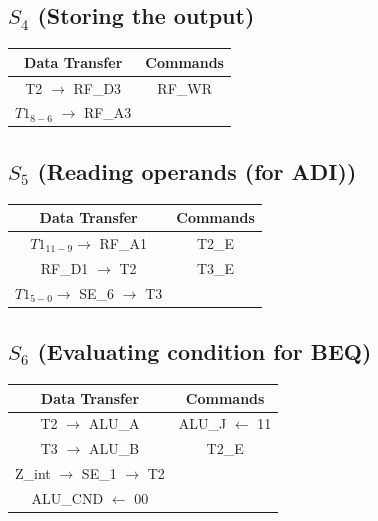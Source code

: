 \documentclass[]{report}
\begin{document}
        \subsection*{$S_4$ (Storing the output)}
        \begin{center}
            \begin{tabular}{|c|c|}
                \hline
                Data Transfer & Commands \\
                \hline
                T2 $\to$ RF\_D3 & RF\_WR\\
                $T1_{8-6}$ $\to$ RF\_A3 & \\                
                \hline
            \end{tabular}
        \end{center}
        \subsection*{$S_5$ (Reading operands (for ADI))}
        \begin{center}
            \begin{tabular}{|c|c|}
                \hline
                Data Transfer & Commands \\
                \hline
                $T1_{11-9} \to$ RF\_A1  & T2\_E\\
                RF\_D1 $\to$ T2 & T3\_E\\
                $T1_{5-0} \to$ SE\_6 $\to$ T3 & \\
                \hline
            \end{tabular}
        \end{center}

        \subsection*{$S_6$ (Evaluating condition for BEQ)} %
        \begin{center}
            \begin{tabular}{|c|c|}
                \hline
                Data Transfer & Commands \\
                \hline
                T2 $\to$ ALU\_A & ALU\_J $\leftarrow$ 11\\
                T3 $\to$ ALU\_B & T2\_E\\
                Z\_int $\to$ SE\_1 $\to$ T2 & \\
                ALU\_CND $\leftarrow$ 00 & \\
                \hline
            \end{tabular}
        \end{center}
\end{document}
